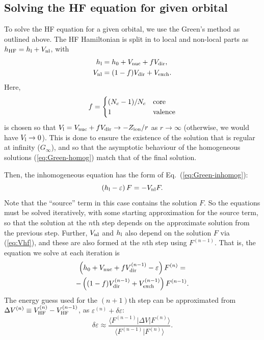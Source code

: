 \documentclass[10pt,twocolumn,a4paper]{article}%
\newcommand{\bra}[1]{\ensuremath{\langle #1|}}	%
\newcommand{\ket}[1]{\ensuremath{|#1\rangle}}	%
\newcommand{\braket}[1]{\ensuremath{\langle #1\rangle}}	%
\newcommand{\be}{\begin{equation}}
\newcommand{\ee}{\end{equation}}
\def\en{\ensuremath{\varepsilon}}
\begin{document}
\subsection{Solving the HF equation for given orbital}\label{sec:hf-orbital}

To solve the HF equation for a given orbital, we use the Green's method as outlined above.
The HF Hamiltonian is split in to local and non-local parts as $h_{\rm HF} = h_{\rm l}+V_{\rm nl}$, with
\begin{align}
h_{\rm l} &= h_0 + V_{\rm nuc}+fV_{\rm dir},\\
V_{\rm nl} &= (1-f)V_{\rm dir}+V_{\rm exch}.
\end{align}
Here,
\be
f=
\begin{cases}
(N_c - 1)/N_c & {\rm core} \\
 1 & {\rm valence}
\end{cases}
\ee
is chosen so that $V_{\rm l} = V_{\rm nuc} +f V_{\rm dir}\to -Z_{\rm ion}/r$ as $r\to\infty$ (otherwise, we would have $V_{\rm l}\to0$).
This is done to ensure the existence of the solution that is regular at infinity ($G_\infty$), and so that the asymptotic behaviour of the homogeneous solutions (\ref{eq:Green-homog})  match that of the final solution.

Then, the inhomogeneous equation has the form of Eq.~(\ref{eq:Green-inhomog}):
\be
\left( h_{\rm l}- \en\right)F = -V_{\rm nl}F.
\ee
Note that the ``source'' term in this case contains the solution $F$.
So the equations must be solved iteratively, with some starting approximation for the source term, so that the solution at the $n$th step depends on the approximate solution from the previous step.
Further, $V_{\rm nl}$ and $h_{\rm l}$ also depend on the solution $F$ via (\ref{eq:Vhf}), and these are also formed at the $n$th step using $F^{(n-1)}$.
That is, the equation we solve at each iteration is
\begin{multline}\label{eq:inhomog-HF}
\left( h_0 + V_{\rm nuc} + fV_{\rm dir}^{(n-1)} - \en\right)F^{(n)} =
\\
 -\left( (1-f)V_{\rm dir}^{(n-1)}+V_{\rm exch}^{(n-1)} \right)F^{(n-1)}.
\end{multline}
%
The energy guess used for the $(n+1)$th step can be approximated from $\Delta V^{(n)} \equiv V_{\rm HF}^{(n)} - V_{\rm HF}^{(n-1)}$, as $\en^{(n)}+\delta\en$:
\be
\delta\en \approx  \frac{\bra{F^{(n-1)}} \Delta V \ket{F^{(n)}}}{\braket{F^{(n-1)}|F^{(n)}}}.
\ee
\end{document}
